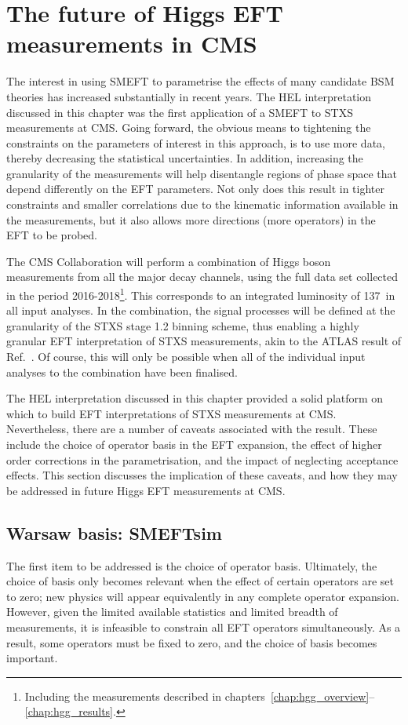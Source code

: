 \section{The future of Higgs EFT measurements in CMS}\label{sec:eft_improving}
The interest in using SMEFT to parametrise the effects of many candidate BSM theories has increased substantially in recent years. The HEL interpretation discussed in this chapter was the first application of a SMEFT to STXS measurements at CMS. Going forward, the obvious means to tightening the constraints on the parameters of interest in this approach, is to use more data, thereby decreasing the statistical uncertainties. In addition, increasing the granularity of the measurements will help disentangle regions of phase space that depend differently on the EFT parameters. Not only does this result in tighter constraints and smaller correlations due to the kinematic information available in the measurements, but it also allows more directions (more operators) in the EFT to be probed.  

The CMS Collaboration will perform a combination of Higgs boson measurements from all the major decay channels, using the full data set collected in the period 2016-2018\footnote{Including the \Hgg measurements described in chapters~\ref{chap:hgg_overview}--\ref{chap:hgg_results}.}. This corresponds to an integrated luminosity of 137~\fbinv in all input analyses. In the combination, the signal processes will be defined at the granularity of the STXS stage 1.2 binning scheme, thus enabling a highly granular EFT interpretation of STXS measurements, akin to the ATLAS result of Ref.~\cite{ATLAS-CONF-2020-053}. Of course, this will only be possible when all of the individual input analyses to the combination have been finalised.

The HEL interpretation discussed in this chapter provided a solid platform on which to build EFT interpretations of STXS measurements at CMS. Nevertheless, there are a number of caveats associated with the result. These include the choice of operator basis in the EFT expansion, the effect of higher order corrections in the parametrisation, and the impact of neglecting acceptance effects.
This section discusses the implication of these caveats, and how they may be addressed in future Higgs EFT measurements at CMS.

\subsection{Warsaw basis: SMEFTsim}\label{sec:smeftsim}
The first item to be addressed is the choice of operator basis. Ultimately, the choice of basis only becomes relevant when the effect of certain operators are set to zero; new physics will appear equivalently in any complete operator expansion. However, given the limited available statistics and limited breadth of measurements, it is infeasible to constrain all EFT operators simultaneously. As a result, some operators must be fixed to zero, and the choice of basis becomes important.

